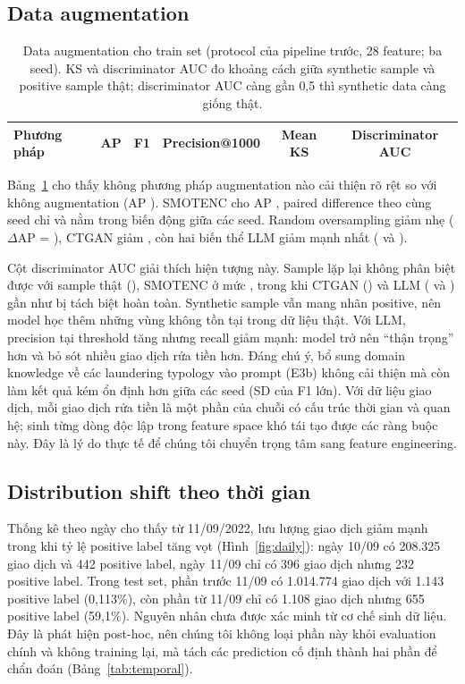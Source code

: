 \documentclass[sigconf,nonacm]{acmart}
\begin{document}
\subsection{Data augmentation}

\begin{table}[t]
\caption{Data augmentation cho train set (protocol của pipeline trước, 28 feature; ba seed). KS và discriminator AUC
đo khoảng cách giữa synthetic sample và positive sample thật; discriminator AUC càng gần 0,5 thì synthetic data càng
giống thật.}
\label{tab:aug}
\begin{tabular}{lccccc}
\toprule
Phương pháp & AP & F1 & Precision@1000 & Mean KS & Discriminator AUC \\
\midrule

\end{tabular}
\end{table}

Bảng~\ref{tab:aug} cho thấy không phương pháp augmentation nào cải thiện rõ rệt so với không augmentation (AP
\EZeroAP). SMOTENC cho AP \EOneAP, paired difference theo cùng seed chỉ \EOneDelta{} và nằm trong biến động giữa các
seed. Random oversampling giảm nhẹ ($\Delta$AP = \ERDelta), CTGAN giảm \ETwoDelta, còn hai biến thể LLM giảm mạnh
nhất (\ELLMaDelta{} và \ELLMbDelta).

Cột discriminator AUC giải thích hiện tượng này. Sample lặp lại không phân biệt được với sample thật (\ERDisc),
SMOTENC ở mức \EOneDisc, trong khi CTGAN (\ETwoDisc) và LLM (\ELLMaDisc{} và \ELLMbDisc) gần như bị tách biệt hoàn
toàn. Synthetic sample vẫn mang nhãn positive, nên model học thêm những vùng không tồn tại trong dữ liệu thật. Với LLM,
precision tại threshold tăng nhưng recall giảm mạnh: model trở nên ``thận trọng'' hơn và bỏ sót nhiều giao dịch rửa
tiền hơn. Đáng chú ý, bổ sung domain knowledge về các laundering typology vào prompt (E3b) không cải thiện mà còn làm
kết quả kém ổn định hơn giữa các seed (SD của F1 lớn). Với dữ liệu giao dịch, mỗi giao dịch rửa tiền là một phần của
chuỗi có cấu trúc thời gian và quan hệ; sinh từng dòng độc lập trong feature space khó tái tạo được các ràng buộc này.
Đây là lý do thực tế để chúng tôi chuyển trọng tâm sang feature engineering.

\subsection{Distribution shift theo thời gian}

Thống kê theo ngày cho thấy từ 11/09/2022, lưu lượng giao dịch giảm mạnh trong khi tỷ lệ positive label tăng vọt
(Hình~\ref{fig:daily}): ngày 10/09 có 208.325 giao dịch và 442 positive label, ngày 11/09 chỉ có 396 giao dịch nhưng
232 positive label. Trong test set, phần trước 11/09 có 1.014.774 giao dịch với 1.143 positive label (0,113\%), còn
phần từ 11/09 chỉ có 1.108 giao dịch nhưng 655 positive label (59,1\%). Nguyên nhân chưa được xác minh từ cơ chế sinh
dữ liệu. Đây là phát hiện post-hoc, nên chúng tôi không loại phần này khỏi evaluation chính và không training lại, mà
tách các prediction cố định thành hai phần để chẩn đoán (Bảng~\ref{tab:temporal}).
\end{document}
